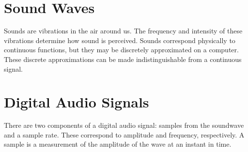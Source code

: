 

\section*{Sound Waves}

Sounds are vibrations in the air around us.
The frequency and intensity of these vibrations determine how sound is perceived.
Sounds correspond physically to continuous functions, but they may be discretely approximated on a computer.
These discrete approximations can be made indistinguishable from a continuous signal.

\section*{Digital Audio Signals}

There are two components of a digital audio signal: samples from the soundwave and a sample rate.
These correspond to amplitude and frequency, respectively.
A sample is a measurement of the amplitude of the wave at an instant in time.

